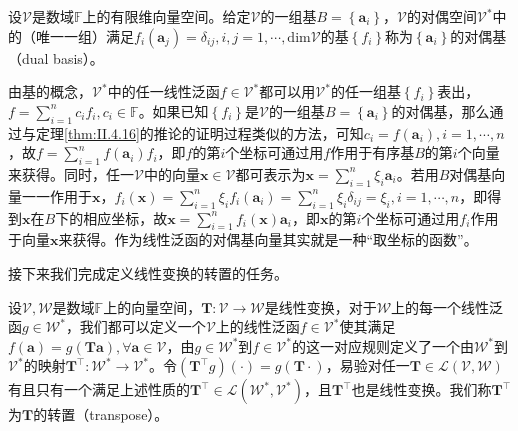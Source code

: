 \documentclass[main.tex]{subfiles}
\begin{document}
\begin{definition}[对偶基]\label{def:II.4.5}
设$\mathcal{V}$是数域$\mathbb{F}$上的有限维向量空间。给定$\mathcal{V}$的一组基$B=\left\{\mathbf{a}_i\right\}$，$\mathcal{V}$的对偶空间$\mathcal{V}^*$中的（唯一一组）满足$f_i\left(\mathbf{a}_j\right)=\delta_{ij},i,j=1,\cdots,\mathrm{dim}\mathcal{V}$的基$\left\{f_i\right\}$称为$\left\{\mathbf{a}_i\right\}$的对偶基（dual basis）。
\end{definition}

由基的概念，$\mathcal{V}^*$中的任一线性泛函$f\in\mathcal{V}^*$都可以用$\mathcal{V}^*$的任一组基$\left\{f_i\right\}$表出，$f=\sum_{i=1}^nc_if_i,c_i\in\mathbb{F}$。如果已知$\left\{f_i\right\}$是$\mathcal{V}$的一组基$B=\left\{\mathbf{a}_i\right\}$的对偶基，那么通过与定理\ref{thm:II.4.16}的推论的证明过程类似的方法，可知$c_i=f\left(\mathbf{a}_i\right),i=1,\cdots,n$，故$f=\sum_{i=1}^nf\left(\mathbf{a}_i\right)f_i$，即$f$的第$i$个坐标可通过用$f$作用于有序基$B$的第$i$个向量来获得。同时，任一$\mathcal{V}$中的向量$\mathbf{x}\in\mathcal{V}$都可表示为$\mathbf{x}=\sum_{i=1}^n\xi_i\mathbf{a}_i$。若用$B$对偶基向量一一作用于$\mathbf{x}$，$f_i\left(\mathbf{x}\right)=\sum_{i=1}^n\xi_if_i\left(\mathbf{a}_i\right)=\sum_{i=1}^n\xi_i\delta_{ij}=\xi_i,i=1,\cdots,n$，即得到$\mathbf{x}$在$B$下的相应坐标，故$\mathbf{x}=\sum_{i=1}^nf_i\left(\mathbf{x}\right)\mathbf{a}_i$，即$\mathbf{x}$的第$i$个坐标可通过用$f_i$作用于向量$\mathbf{x}$来获得。作为线性泛函的对偶基向量其实就是一种“取坐标的函数”。

接下来我们完成定义线性变换的转置的任务。

\begin{definition}[线性变换的转置]\label{def:II.4.6}
设$\mathcal{V},\mathcal{W}$是数域$\mathbb{F}$上的向量空间，$\mathbf{T}:\mathcal{V}\rightarrow\mathcal{W}$是线性变换，对于$\mathcal{W}$上的每一个线性泛函$g\in\mathcal{W}^*$，我们都可以定义一个$\mathcal{V}$上的线性泛函$f\in\mathcal{V}^*$使其满足$f\left(\mathbf{a}\right)=g\left(\mathbf{Ta}\right),\forall \mathbf{a}\in\mathcal{V}$，由$g\in\mathcal{W}^*$到$f\in\mathcal{V}^*$的这一对应规则定义了一个由$\mathcal{W}^*$到$\mathcal{V}^*$的映射$\mathbf{T}^\intercal:\mathcal{W}^*\rightarrow\mathcal{V}^*$。令$\left(\mathbf{T}^\intercal g\right)\left(\cdot\right)=g\left(\mathbf{T}\cdot\right)$，易验对任一$\mathbf{T}\in\mathcal{L}\left(\mathcal{V},\mathcal{W}\right)$有且只有一个满足上述性质的$\mathbf{T}^\intercal\in\mathcal{L}\left(\mathcal{W}^*,\mathcal{V}^*\right)$，且$\mathbf{T}^\intercal$也是线性变换。我们称$\mathbf{T}^\intercal$为$\mathbf{T}$的转置（transpose）。
\end{definition}
\end{document}
